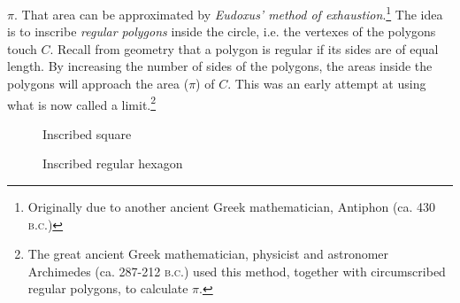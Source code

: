 {\begin{enumerate}[\bfseries 1.]
  $\pi$. That area can be approximated by \emph{Eudoxus' method of
  exhaustion}.\footnote{Originally
  due  to another ancient Greek mathematician, Antiphon (ca. 430 \textsc{b.c.})}
  The idea is to inscribe \emph{regular polygons} inside
  the circle, i.e. the vertexes of the polygons touch $C$. Recall from geometry
  that a polygon is regular if its sides are of equal length. By increasing the
  number of sides of the polygons, the areas inside the polygons will approach
  the area ($\pi$) of $C$. This was an early attempt at using what is now
  called a limit.\footnote{The great ancient Greek mathematician, physicist and
  astronomer Archimedes (ca. 287-212 \textsc{b.c.}) used this method, together
  with circumscribed regular polygons, to calculate $\pi$.}

\begin{figure}[ht]
\begin{minipage}[b]{7.5cm}
 \begin{center}
  \vspace{-5mm}
 \end{center}
 \caption[]{\quad Inscribed square}
 \label{fig:insquare}
\end{minipage}
\begin{minipage}[b]{7.5cm}
 \begin{center}
  \vspace{-5mm}
 \end{center}
 \caption[]{\quad Inscribed regular hexagon}
 \label{fig:inhexagon}
\end{minipage}
\end{figure}\vspace{-2mm}


\end{enumerate}}
